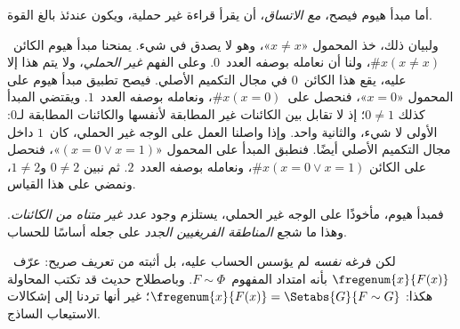 \documentclass[../../../include/open-logic-section]{subfiles}
\begin{document}
أما مبدأ هيوم فيصح، \emph{مع الاتساق}، أن يقرأ قراءة غير حملية، ويكون
عندئذ بالغ القوة.

ولبيان ذلك، خذ المحمول «$x \neq x$»، وهو لا يصدق في شيء. يمنحنا مبدأ
هيوم الكائن~$\# x( x\neq x)$، ولنا أن نعامله بوصفه العدد~$0$. وعلى
الفهم \emph{غير الحملي}، ولا يتم هذا إلا عليه، يقع هذا الكائن~$0$
في مجال التكميم الأصلي. فيصح تطبيق مبدأ هيوم على المحمول «$x = 0$»،
فنحصل على~$\#x (x = 0)$، ونعامله بوصفه العدد~$1$. ويقتضي المبدأ كذلك
$0 \neq 1$؛ إذ لا تقابل بين الكائنات غير المطابقة لأنفسها والكائنات
المطابقة لـ$0$: الأولى لا شيء، والثانية واحد. وإذا واصلنا العمل على
الوجه غير الحملي، كان~$1$ داخل مجال التكميم الأصلي أيضًا. فنطبق المبدأ
على المحمول «$(x = 0 \lor x = 1)$»، فنحصل على الكائن
$\#x(x = 0 \lor x = 1)$، ونعامله بوصفه العدد~$2$. ثم نبين
$0\neq 2$ و$1 \neq 2$، ونمضي على هذا القياس.

فمبدأ هيوم، مأخوذًا على الوجه غير الحملي، يستلزم وجود \emph{عدد غير
متناه من الكائنات}. وهذا ما شجع \emph{المناطقة الفريغيين الجدد} على
جعله أساسًا للحساب.

لكن فرغه \emph{نفسه} لم يؤسس الحساب عليه، بل أثبته من تعريف صريح:
عرّف~$\fregenum{x}{F(x)}$ بأنه امتداد المفهوم~$F \sim \Phi$.
وباصطلاح حديث قد تكتب المحاولة هكذا:
$\fregenum{x}{F(x)} = \Setabs{G}{F \sim G}$؛ غير أنها تردنا إلى
إشكالات الاستيعاب الساذج.
\end{document}
